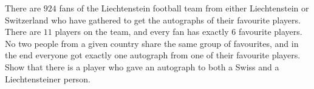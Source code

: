 There are $924$ fans of the Liechtenstein football team from either Liechtenstein or Switzerland who
have gathered to get the autographs of their favourite players.
There are $11$ players on the team, and every fan has exactly $6$ favourite players.
No two people from a given country share the same group of favourites,
and in the end everyone got exactly one autograph from one of their favourite players.
Show that there is a player who gave an autograph to both a Swiss and a Liechtensteiner person.
